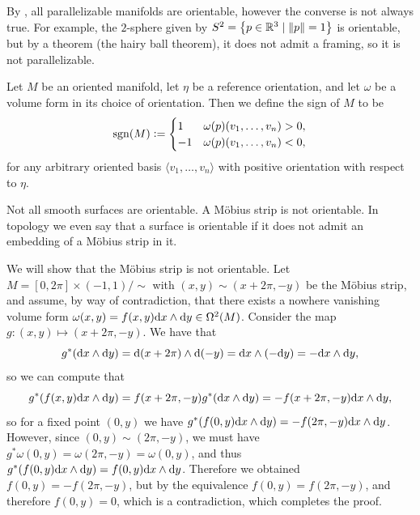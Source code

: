 \documentclass[11pt,a4paper]{article}
\begin{document}
\begin{remark}
  By ,
  all parallelizable manifolds are orientable,
  however the converse is not always true.
  For example, the $2$-sphere
  given by $S^2 = \left\{p \in \mathbb{R}^3 \mid \left\lVert p\right\rVert = 1\right\}$
  is orientable,
  but by a theorem (the hairy ball theorem),
  it does not admit a framing, so it is not parallelizable.
\end{remark}

\begin{definition}
  Let $M$ be an oriented manifold,
  let $\eta$ be a reference orientation,
  and let $\omega$ be a volume form in its choice of orientation.
  Then we define the sign of $M$ to be
  \[
    \operatorname{sgn}(M) :=
    \begin{cases}
      1 &\omega(p)(v_1,\dots,v_n) > 0, \\
      -1 &\omega(p)(v_1,\dots,v_n) < 0,
    \end{cases}
  \]
  for any arbitrary oriented basis $\langle v_1,\dots,v_n\rangle$
  with positive orientation with respect to $\eta$.
\end{definition}

\begin{example}
  Not all smooth surfaces are orientable.
  A M\"obius strip is not orientable.
  In topology we even say that a surface is orientable if it does not
  admit an embedding of a M\"obius strip in it.

  We will show that the M\"obius strip is not orientable.
  Let $M = [0,2\pi] \times (-1,1) / \sim$ with $(x,y) \sim (x + 2\pi,-y)$
  be the M\"obius strip,
  and assume, by way of contradiction,
  that there exists a nowhere vanishing volume form
  $\omega(x,y) = f(x,y) \dx \wedge \dy \in \Omega^2(M)$.
  Consider the map $g \colon (x,y) \mapsto (x + 2\pi,-y)$.
  We have that
  \[
    g^*(\dx \wedge \dy) =
    \dif(x + 2\pi) \wedge \dif(-y) =
    \dx \wedge (-\dy) = -\dx \wedge \dy,
  \]
  so we can compute that
  \[
    g^*(f(x,y) \dx \wedge \dy) =
    f(x + 2\pi,-y) g^*(\dx \wedge \dy) =
    -f(x + 2\pi,-y) \dx \wedge \dy,
  \]
  so for a fixed point $(0,y)$ we have
  $g^*(f(0,y) \dx \wedge \dy) = -f(2\pi,-y) \dx \wedge \dy$.
  However, since $(0,y) \sim (2\pi,-y)$,
  we must have $g^*\omega(0,y) = \omega(2\pi,-y) = \omega(0,y)$,
  and thus $g^*(f(0,y) \dx \wedge \dy) = f(0,y) \dx \wedge \dy$.
  Therefore we obtained $f(0,y) = -f(2\pi,-y)$,
  but by the equivalence $f(0,y) = f(2\pi,-y)$,
  and therefore $f(0,y) = 0$, which is a contradiction,
  which completes the proof.
\end{example}
\end{document}
